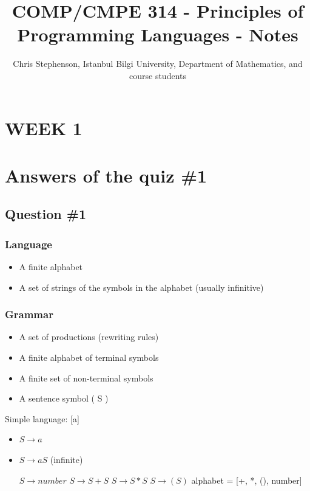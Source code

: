 \documentclass{article}
\begin{document}
\title{COMP/CMPE 314 - Principles of Programming Languages - Notes}
\author{Chris Stephenson, Istanbul Bilgi University, Department of Mathematics, and course students}
\maketitle

\section*{WEEK 1}
\section*{Answers of the quiz \#1}
\subsection*{Question \#1}
\subsubsection*{Language}
  \begin{itemize}
        \item A finite alphabet
        \item A set of strings of the symbols in the alphabet (usually infinitive)
   \end{itemize}
 
\subsubsection*{Grammar}
  \begin{itemize}
   \item A set of productions (rewriting rules)
   \item A finite alphabet of terminal symbols
   \item A finite set of non-terminal symbols
   \item A sentence symbol ( S )
  \end{itemize}

Simple language: [a] 
  \begin{itemize}
   \item $S \rightarrow a$
   \item $S \rightarrow aS$ (infinite)
   
   $S \rightarrow number$\newline
   $S \rightarrow S + S$\newline
   $S \rightarrow S * S$\newline
   $S \rightarrow (S)$\newline
   alphabet = [+, *, (), number]
  
  \end{itemize}
  
\end{document}
